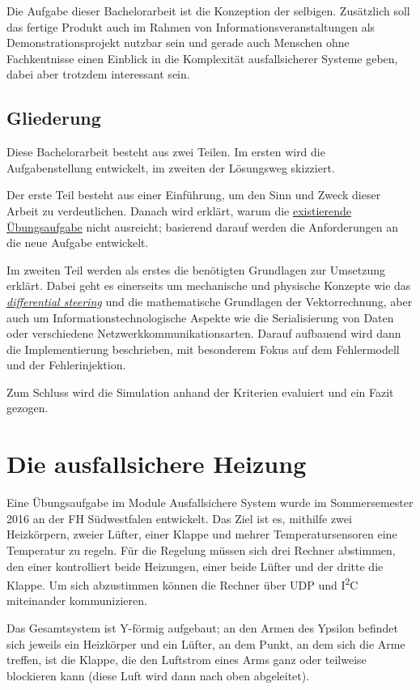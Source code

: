 Die Aufgabe dieser Bachelorarbeit ist die Konzeption der selbigen. Zus{\"{a}}tzlich soll das fertige Produkt auch im Rahmen von Informationsveranstaltungen als Demonstrationsprojekt
nutzbar sein und gerade auch Menschen ohne Fachkentnisse einen Einblick in die Komplexit{\"{a}}t ausfallsicherer Systeme geben, dabei aber trotzdem interessant
sein.

\subsection{Gliederung} Diese Bachelorarbeit besteht aus zwei Teilen. Im ersten wird die Aufgabenstellung entwickelt, im zweiten der L{\"{o}}sungsweg skizziert.

Der erste Teil besteht aus einer Einf{\"{u}}hrung, um den Sinn und Zweck dieser Arbeit zu verdeutlichen. Danach wird erkl{\"{a}}rt, warum die
\hyperref[heizung]{existierende {\"{U}}bungsaufgabe} nicht ausreicht; basierend darauf werden die Anforderungen an die neue Aufgabe entwickelt.

Im zweiten Teil werden als erstes die ben{\"{o}}tigten Grundlagen zur Umsetzung erkl{\"{a}}rt. Dabei geht es einerseits um mechanische und physische Konzepte wie das
\hyperref[diffs]{\textit{differential steering}} und die mathematische Grundlagen der Vektorrechnung, aber auch um Informationstechnologische Aspekte wie die Serialisierung von Daten oder
verschiedene Netzwerkkommunikationsarten. Darauf aufbauend wird dann die Implementierung beschrieben, mit besonderem Fokus auf dem Fehlermodell und der
Fehlerinjektion.

Zum Schluss wird die Simulation anhand der Kriterien evaluiert und ein Fazit gezogen.

\clearpage
\section{Die ausfallsichere Heizung}\label{heizung}
Eine {\"{U}}bungsaufgabe im Module Ausfallsichere System wurde im Sommersemester 2016 an der FH S{\"{u}}dwestfalen entwickelt. Das Ziel ist es, mithilfe zwei Heizk{\"{o}}rpern, zweier
L{\"{u}}fter, einer Klappe und mehrer Temperatursensoren eine Temperatur zu regeln. F{\"{u}}r die Regelung m{\"{u}}ssen sich drei Rechner abstimmen, den einer kontrolliert
beide Heizungen, einer beide L{\"{u}}fter und der dritte die Klappe. Um sich abzustimmen k{\"{o}}nnen die Rechner {\"{u}}ber UDP und I\textsuperscript{2}C miteinander kommunizieren.

Das Gesamtsystem ist Y-f{\"{o}}rmig aufgebaut; an den Armen des Ypsilon befindet sich jeweils ein Heizk{\"{o}}rper und ein L{\"{u}}fter, an dem Punkt, an dem sich
die Arme treffen, ist die Klappe, die den Luftstrom eines Arms ganz oder teilweise blockieren kann (diese Luft wird dann nach oben abgeleitet).

